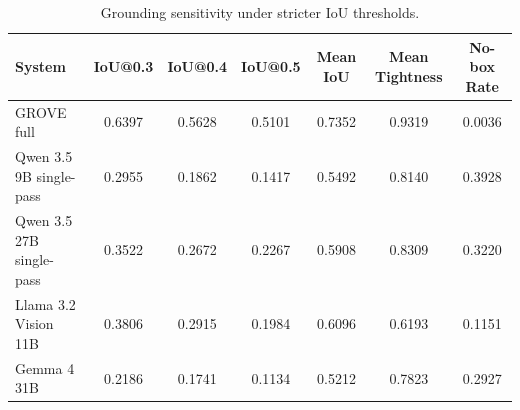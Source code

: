 \begin{table}[t]
\centering
\small
\caption{Grounding sensitivity under stricter IoU thresholds.}
\label{tab:iou\_sensitivity}
\begin{tabular}{lcccccc}
\toprule
System & IoU@0.3 & IoU@0.4 & IoU@0.5 & Mean IoU & Mean Tightness & No-box Rate \\
\midrule
GROVE full & 0.6397 & 0.5628 & 0.5101 & 0.7352 & 0.9319 & 0.0036 \\
Qwen 3.5 9B single-pass & 0.2955 & 0.1862 & 0.1417 & 0.5492 & 0.8140 & 0.3928 \\
Qwen 3.5 27B single-pass & 0.3522 & 0.2672 & 0.2267 & 0.5908 & 0.8309 & 0.3220 \\
Llama 3.2 Vision 11B & 0.3806 & 0.2915 & 0.1984 & 0.6096 & 0.6193 & 0.1151 \\
Gemma 4 31B & 0.2186 & 0.1741 & 0.1134 & 0.5212 & 0.7823 & 0.2927 \\
\bottomrule
\end{tabular}
\end{table}
